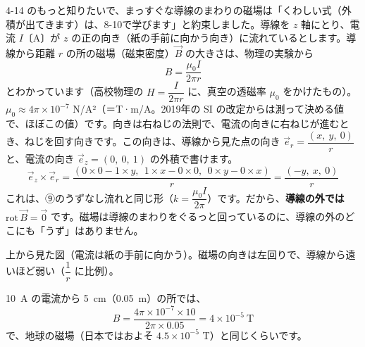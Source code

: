 
\leavevmode\label{bk:8-10:jiba}4-14 のもっと知りたいで、まっすぐな導線のまわりの磁場は「くわしい式（外積が出てきます）は、8-10で学びます」と約束しました。導線を $z$ 軸にとり、電流 $I$〔A〕が $z$ の正の向き（紙の手前に向かう向き）に流れているとします。導線から距離 $r$ の所の磁場（磁束密度）$\vec B$ の大きさは、物理の実験から
\[ B=\frac{\mu_0I}{2\pi r} \]
とわかっています（高校物理の $H=\dfrac{I}{2\pi r}$ に、真空の透磁率 $\mu_0$ をかけたもの）。$\mu_0\approx4\pi\times10^{-7}$ N/A²（＝T·m/A。2019年の SI の改定からは測って決める値で、ほぼこの値）です。向きは右ねじの法則で、電流の向きに右ねじが進むとき、ねじを回す向きです。この向きは、導線から見た点の向き $\vec e_r=\dfrac{(x,\ y,\ 0)}{r}$ と、電流の向き $\vec e_z=(0,\ 0,\ 1)$ の外積で書けます。
\[ \vec e_z\times\vec e_r=\frac{(0\times0-1\times y,\ \ 1\times x-0\times0,\ \ 0\times y-0\times x)}{r}=\frac{(-y,\ x,\ 0)}{r} \]
これは、⑨のうずなし流れと同じ形（$k=\dfrac{\mu_0I}{2\pi}$）です。だから、\textbf{導線の外では $\mathrm{rot}\,\vec B=\vec0$} です。磁場は導線のまわりをぐるっと回っているのに、導線の外のどこにも「うず」はありません。

\begin{bkfigure}
\begin{minipage}[c]{0.44\linewidth}
\centering
{}
\end{minipage}\hfill
\begin{minipage}[c]{0.53\linewidth}\raggedright
上から見た図（電流は紙の手前に向かう）。磁場の向きは左回りで、導線から遠いほど弱い（$\dfrac{1}{r}$ に比例）。\par\vspace{3pt}
\qty{10}{A} の電流から \qty{5}{cm}（\qty{0.05}{m}）の所では、
\[ B=\frac{4\pi\times10^{-7}\times10}{2\pi\times0.05}=4\times10^{-5}\ \text{T} \]
で、地球の磁場（日本ではおよそ $4.5\times10^{-5}$ T）と同じくらいです。\par\vspace{2mm}
\end{minipage}
\label{bk:8-10:fig-jiba}
\end{bkfigure}

